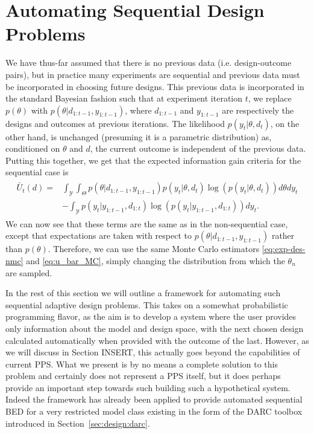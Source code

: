 
\section{Automating Sequential Design Problems}
\label{sec:design:seq}

We have thus-far assumed that there is no previous data (i.e. design-outcome pairs), but in practice many 
experiments are sequential and previous data must be incorporated in choosing future designs.
This previous data is incorporated in the standard Bayesian fashion such that
at experiment iteration $t$, we replace $p\left(\theta\right)$ with 
$p\left(\theta | d_{1:t-1}, y_{1:t-1}\right)$, where $d_{1:t-1}$ and  $y_{1:t-1}$ are 
respectively the designs and outcomes at previous iterations.
The likelihood $p\left(y_t | \theta, d_t\right)$, on the other hand, is unchanged (presuming it 
is a parametric distribution) as, conditioned on 
$\theta$ and $d$, the current outcome is independent of the previous data.
Putting this together, we get that the expected information gain criteria for the
sequential case is
\begin{align}
\label{eq:u_bar_seq}
\begin{split}
\bar{U}_t(d)
=&\int_{\mathcal{Y}}\int_{\Theta} p\left(\theta | d_{1:t-1}, y_{1:t-1}\right)
p(y_t | \theta, d_t) \log(p(y_t | \theta, d_t)) d\theta dy_t \\
&- \int_{\mathcal{Y}} p(y_t | y_{1:t-1}, d_{1:t}) \log(p(y_t | y_{1:t-1}, d_{1:t}))dy_t.
\end{split}
\end{align}
We can now see that these terms are the same as in the non-sequential case,
except that expectations are taken with respect to $p\left(\theta | d_{1:t-1}, y_{1:t-1}\right)$
rather than $p(\theta)$.  Therefore, we can use the same Monte Carlo estimators
\eqref{eq:exp-des-nmc} and \eqref{eq:u_bar_MC}, simply changing the distribution from which
the $\theta_n$ are sampled.

In the rest of this section we will outline a framework for automating such sequential
adaptive design problems.  This takes on a somewhat probabilistic programming flavor, as
the aim is to develop a system where the user provides only information about the model and
design space, with the next chosen design calculated automatically when provided with
the outcome of the last.  However, as we will discuss in Section INSERT, this actually goes
beyond the capabilities of current PPS.  What we present is by no means a complete solution to
this problem and certainly does not represent a PPS itself, but it does perhaps provide an important
step towards such building such a hypothetical system.   Indeed the framework has already been
applied to provide automated sequential BED for a very restricted model class existing in the form of
the DARC toolbox~\citep{vincent2017darc} introduced in Section~\ref{sec:design:darc}.

